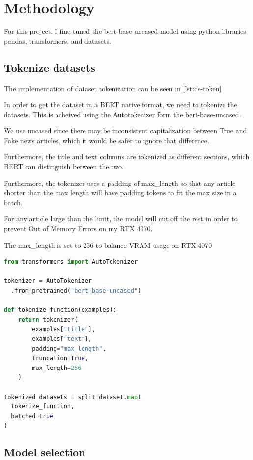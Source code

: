 \documentclass[conference]{IEEEtran}
\begin{document}
\section{Methodology}

For this project, I fine-tuned the bert-base-uncased model using python libraries pandas, transformers, and datasets.

\subsection{Tokenize datasets}

The implementation of dataset tokenization can be seen in \ref{lst:ds-token}

In order to get the dataset in a BERT native format, we need to tokenize the datasets. This is acheived using the Autotokenizer form the bert-base-uncased.

We use uncased since there may be inconsistent capitalization between True and Fake news articles, which it would be safer to ignore that difference.

Furthermore, the title and text columns are tokenized as different sections, which BERT can distinguish between the two.

Furthermore, the tokenizer uses a padding of max\_length so that any article shorter than the max length will have padding tokens to fit the max size in a batch.

For any article large than the limit, the model will cut off the rest in order to prevent Out of Memory Errors on my RTX 4070.

The max\_length is set to 256 to balance VRAM usage on RTX 4070


\begin{lstlisting}[language=Python,caption={Dataset Tokenization},label={lst:ds-token}]
from transformers import AutoTokenizer

tokenizer = AutoTokenizer
  .from_pretrained("bert-base-uncased")

def tokenize_function(examples):
    return tokenizer(
        examples["title"], 
        examples["text"], 
        padding="max_length", 
        truncation=True, 
        max_length=256
    )

tokenized_datasets = split_dataset.map(
  tokenize_function,
  batched=True
)
\end{lstlisting}


\subsection{Model selection}
\end{document}
